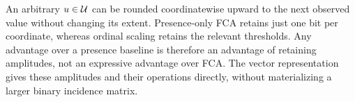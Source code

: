 An arbitrary $u\in\mathcal{U}$ can be rounded coordinatewise upward to the next
observed value without changing its extent. Presence-only FCA retains
just one bit per coordinate, whereas ordinal scaling retains the relevant
thresholds. Any advantage over a presence baseline is therefore an
advantage of retaining amplitudes, not an expressive advantage over FCA.
The vector representation gives these amplitudes and their operations
directly, without materializing a larger binary incidence matrix.
